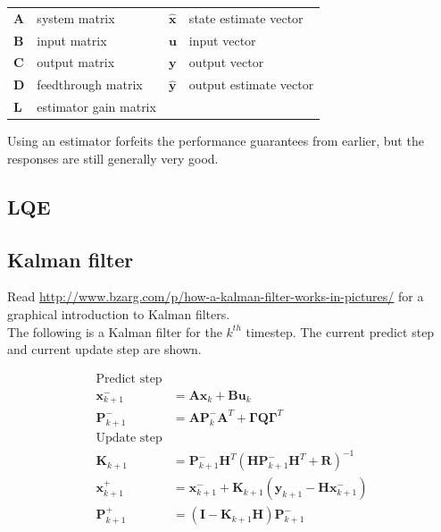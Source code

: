 \documentclass[10pt,conference,compsoc]{IEEEtran}
\newcommand{\mtx}[1] {\bm #1}
\begin{document}
\begin{table}[ht]
  \renewcommand{\arraystretch}{1.3}
  \centering
  \begin{tabular}{llll}
    $\mtx{A}$ & system matrix      & $\hat{\mtx{x}}$ & state estimate vector \\
    $\mtx{B}$ & input matrix       & $\mtx{u}$ & input vector \\
    $\mtx{C}$ & output matrix      & $\mtx{y}$ & output vector \\
    $\mtx{D}$ & feedthrough matrix & $\hat{\mtx{y}}$ & output estimate vector \\
    $\mtx{L}$ & estimator gain matrix & & \\
  \end{tabular}
  \label{tab:obsv_def}
\end{table}

\noindent Using an estimator forfeits the performance guarantees from earlier,
but the responses are still generally very good.

\subsection{LQE}

\subsection{Kalman filter}

\noindent Read \url{http://www.bzarg.com/p/how-a-kalman-filter-works-in-pictures/} for a graphical introduction to Kalman filters. \\

\noindent The following is a Kalman filter for the $k^{th}$ timestep. The
current predict step and current update step are shown.

\begin{align}
  \text{Predict step} \nonumber \\
  \mtx{x}_{k+1}^- &= \mtx{A} \mtx{x}_k + \mtx{B} \mtx{u}_k \label{eq:pre1_x} \\
  \mtx{P}_{k+1}^- &= \mtx{A} \mtx{P}_k^- \mtx{A}^T +
    \mtx{\Gamma}\mtx{Q}\mtx{\Gamma}^T \\
  \text{Update step} \nonumber \\
  \mtx{K}_{k+1} &= \mtx{P}_{k+1}^- \mtx{H}^T (\mtx{H}\mtx{P}_{k+1}^- \mtx{H}^T +
    \mtx{R})^{-1} \\
  \mtx{x}_{k+1}^+ &= \mtx{x}_{k+1}^- + \mtx{K}_{k+1} (\mtx{y}_{k+1} -
    \mtx{H} \mtx{x}_{k+1}^-) \label{eq:post1_x} \\
  \mtx{P}_{k+1}^+ &= (\mtx{I} - \mtx{K}_{k+1}\mtx{H})\mtx{P}_{k+1}^-
\end{align}
\end{document}
